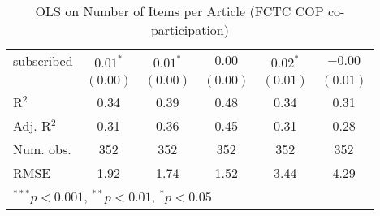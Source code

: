 \begin{table}[!h]
\begin{center}
\begin{tabular}{l c c c c c }
subscribed              & $0.01^{*}$   & $0.01^{*}$   & $0.00$       & $0.02^{*}$   & $-0.00$      \\
                        & $(0.00)$     & $(0.00)$     & $(0.00)$     & $(0.01)$     & $(0.01)$     \\
\midrule
R$^2$                   & 0.34         & 0.39         & 0.48         & 0.34         & 0.31         \\
Adj. R$^2$              & 0.31         & 0.36         & 0.45         & 0.31         & 0.28         \\
Num. obs.               & 352          & 352          & 352          & 352          & 352          \\
RMSE                    & 1.92         & 1.74         & 1.52         & 3.44         & 4.29         \\
\bottomrule
\multicolumn{6}{l}{\scriptsize{$^{***}p<0.001$, $^{**}p<0.01$, $^*p<0.05$}}
\end{tabular}
\caption{OLS on Number of Items per Article (FCTC COP co-participation)}
\label{table:coefficients}
\end{center}
\end{table}
